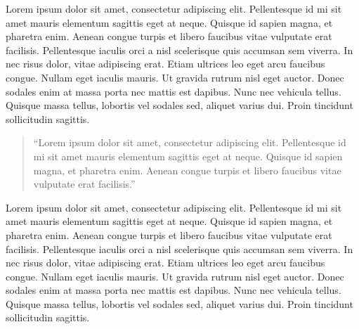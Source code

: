 Lorem ipsum dolor sit amet, consectetur adipiscing elit. Pellentesque id mi sit
amet mauris elementum sagittis eget at neque. Quisque id sapien magna, et
pharetra enim. Aenean congue turpis et libero faucibus vitae vulputate erat
facilisis. Pellentesque \citet[2008]{CCC:2008} iaculis orci a nisl scelerisque
quis accumsan sem viverra. In nec risus dolor, vitae adipiscing erat. Etiam
ultrices leo eget arcu faucibus congue. Nullam eget iaculis mauris. Ut gravida
rutrum nisl eget auctor. Donec sodales enim at massa porta nec mattis est
dapibus. Nunc nec vehicula tellus. Quisque massa tellus, lobortis vel sodales
sed, aliquet varius dui. Proin tincidunt sollicitudin sagittis. 
\begin{quote}
 ``Lorem ipsum dolor sit amet, consectetur adipiscing elit. Pellentesque id mi
sit amet mauris elementum sagittis eget at neque. Quisque id sapien magna, et
pharetra enim. Aenean congue turpis et libero faucibus vitae vulputate erat
facilisis.''
\end{quote}
Lorem ipsum dolor sit amet, consectetur adipiscing elit. Pellentesque id mi sit
amet mauris elementum sagittis eget at neque. Quisque id sapien magna, et
pharetra enim. Aenean congue turpis et libero faucibus vitae vulputate erat
facilisis. Pellentesque iaculis orci a nisl scelerisque quis accumsan sem
viverra. In nec risus dolor, vitae adipiscing erat. Etiam ultrices leo eget arcu
faucibus congue. Nullam eget iaculis mauris. Ut gravida rutrum nisl eget auctor.
Donec sodales enim at massa porta nec mattis est dapibus. Nunc nec vehicula
tellus. Quisque massa tellus, lobortis vel sodales sed, aliquet varius dui.
Proin tincidunt sollicitudin sagittis. 
